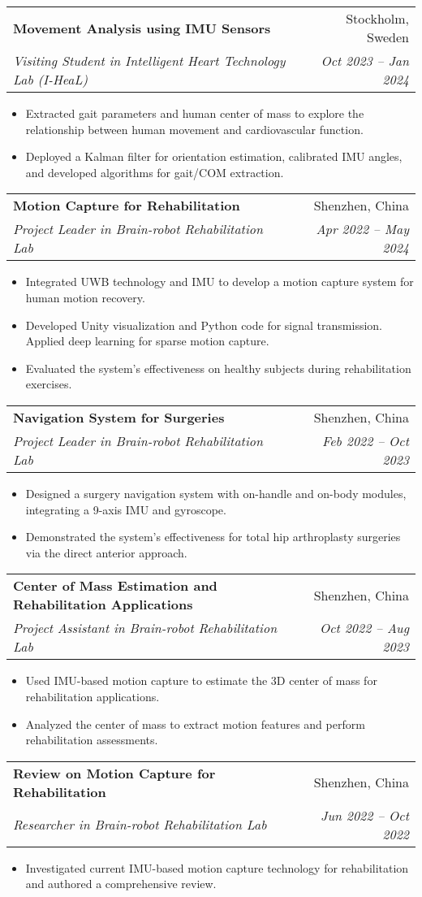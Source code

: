 \documentclass[letterpaper,11pt]{article}
\makeatletter
\newcommand{\resumeItem}[1]{
  \item\small{
    {#1 \vspace{-2pt}}
  }
}
\newcommand{\resumeSubheading}[4]{
  \vspace{-2pt}\item
    \begin{tabular*}{0.97\textwidth}[t]{l@{\extracolsep{\fill}}r}
      \textbf{#1} & #2 \\
      \textit{\small#3} & \textit{\small #4} \\
    \end{tabular*}\vspace{-7pt}
}
\newcommand{\resumeItemListStart}{\begin{itemize}}
\newcommand{\resumeItemListEnd}{\end{itemize}\vspace{-5pt}}
\makeatother
\begin{document}
\resumeSubheading
{Movement Analysis using IMU Sensors}{Stockholm, Sweden}
{Visiting Student in Intelligent Heart Technology Lab (I-HeaL)}{Oct 2023 -- Jan 2024}
\resumeItemListStart
\resumeItem{Extracted gait parameters and human center of mass to explore the relationship between human movement and cardiovascular function.}
\resumeItem{Deployed a Kalman filter for orientation estimation, calibrated IMU angles, and developed algorithms for gait/COM extraction.}
\resumeItemListEnd

\resumeSubheading
{Motion Capture for Rehabilitation}{Shenzhen, China}
{Project Leader in Brain-robot Rehabilitation Lab}{Apr 2022 -- May 2024}
\resumeItemListStart
\resumeItem{Integrated UWB technology and IMU to develop a motion capture system for human motion recovery.}
\resumeItem{Developed Unity visualization and Python code for signal transmission.
  Applied deep learning for sparse motion capture.
}
\resumeItem{Evaluated the system’s effectiveness on healthy subjects during rehabilitation exercises.}
\resumeItemListEnd

\resumeSubheading
{Navigation System for Surgeries}{Shenzhen, China}
{Project Leader in Brain-robot Rehabilitation Lab}{Feb 2022 -- Oct 2023}
\resumeItemListStart
\resumeItem{Designed a surgery navigation system with on-handle and on-body modules, integrating a 9-axis IMU and gyroscope.}
\resumeItem{Demonstrated the system’s effectiveness for total hip arthroplasty surgeries via the direct anterior approach.}
\resumeItemListEnd

\resumeSubheading
{Center of Mass Estimation and Rehabilitation Applications}{Shenzhen, China}
{Project Assistant in Brain-robot Rehabilitation Lab}{Oct 2022 -- Aug 2023}
\resumeItemListStart
\resumeItem{Used IMU-based motion capture to estimate the 3D center of mass for rehabilitation applications.}
\resumeItem{Analyzed the center of mass to extract motion features and perform rehabilitation assessments.}
\resumeItemListEnd

\resumeSubheading
{Review on Motion Capture for Rehabilitation}{Shenzhen, China}
{Researcher in Brain-robot Rehabilitation Lab}{Jun 2022 -- Oct 2022}
\resumeItemListStart
\resumeItem{Investigated current IMU-based motion capture technology for rehabilitation and authored a comprehensive review.}
\resumeItemListEnd
\end{document}

